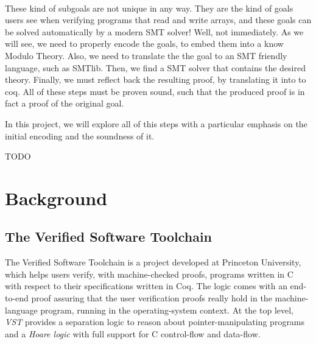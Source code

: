 \documentclass[onecolumn, preprint]{sigplanconf}
\begin{document}
\

These kind of subgoals are not unique in any way. They are the kind of goals users see when verifying programs that read and write arrays, and these goals can be solved automatically by a modern SMT solver! Well, not immediately. As we will see, we need to properly encode the goals, to embed them into a know Modulo Theory. Also, we need to translate the the goal to an SMT friendly language, such as SMTlib. Then, we find a SMT solver that contains the desired theory. Finally, we must reflect back the resulting proof, by translating it into to coq. All of these steps must be proven sound, such that the produced proof is in fact a proof of the original goal. %

In this project, we will explore all of this steps with a particular emphasis on the initial encoding and the soundness of it.






TODO





\section{Background}
\label{sec:background}

\subsection{The Verified Software Toolchain}

The Verified Software Toolchain is a project developed at Princeton University\cite{VST}, which helps users verify, with machine-checked proofs, programs written in C with respect to their specifications written in Coq. The logic comes with an end-to-end proof assuring that the user verification proofs really hold in the machine-language program, running in the operating-system context. At the top level, \emph{VST} provides a separation logic to reason about pointer-manipulating programs and a \emph{Hoare logic} with full support for C control-flow and data-flow. 
\end{document}

